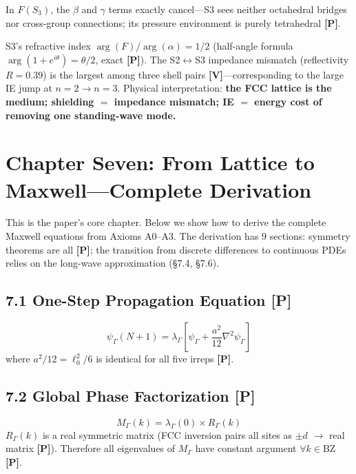 \documentclass[11pt,a4paper]{article}
\newcommand{\gradeP}{\textbf{[P]}}
\newcommand{\gradeV}{\textbf{[V]}}
\begin{document}
In $F(S_3)$, the $\beta$ and $\gamma$ terms exactly cancel---S3 sees neither octahedral bridges nor cross-group connections; its pressure environment is purely tetrahedral \gradeP.

S3's refractive index $\arg(F)/\arg(\alpha)=1/2$ (half-angle formula $\arg(1+e^{i\theta})=\theta/2$, exact \gradeP). The S2$\leftrightarrow$S3 impedance mismatch (reflectivity $R=0.39$) is the largest among three shell pairs \gradeV---corresponding to the large IE jump at $n=2\to n=3$. Physical interpretation: \textbf{the FCC lattice is the medium; shielding $=$ impedance mismatch; IE $=$ energy cost of removing one standing-wave mode.}

\section{Chapter Seven: From Lattice to Maxwell---Complete Derivation}\label{sec:ch7}

This is the paper's core chapter. Below we show how to derive the complete Maxwell equations from Axioms A0--A3. The derivation has 9 sections: symmetry theorems are all \gradeP; the transition from discrete differences to continuous PDEs relies on the long-wave approximation (\S7.4, \S7.6).

\subsection{7.1 One-Step Propagation Equation \gradeP}

\begin{equation}
\psi_\Gamma(N+1) = \lambda_\Gamma\left[\psi_\Gamma + \frac{a^2}{12}\nabla^2\psi_\Gamma\right]
\end{equation}
where $a^2/12 = \ell_0^2/6$ is identical for all five irreps \gradeP.

\subsection{7.2 Global Phase Factorization \gradeP}

\begin{equation}
M_\Gamma(k) = \lambda_\Gamma(0)\times R_\Gamma(k)
\end{equation}
$R_\Gamma(k)$ is a real symmetric matrix (FCC inversion pairs all sites as $\pm d$ $\to$ real matrix \gradeP). Therefore all eigenvalues of $M_\Gamma$ have constant argument $\forall k\in\mathrm{BZ}$ \gradeP.
\end{document}
